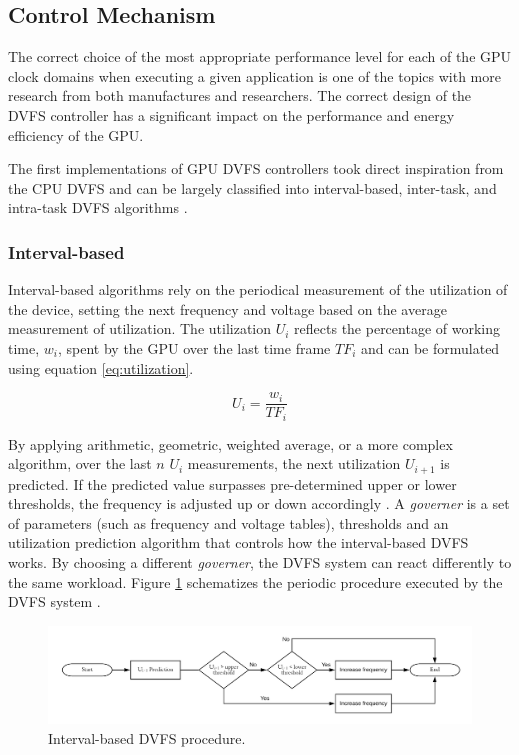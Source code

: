 \subsection{Control Mechanism}

The correct choice of the most appropriate performance level for each of the GPU clock domains when executing a given application is one of the topics with more research from both manufactures and researchers. The correct design of the DVFS controller has a significant impact on the performance and energy efficiency of the GPU.

The first implementations of GPU DVFS controllers took direct inspiration from the CPU DVFS and can be largely classified into interval-based, inter-task, and intra-task DVFS algorithms \cite{boyer_improving_2013}. 

\subsubsection{Interval-based}

Interval-based algorithms rely on the periodical measurement of the utilization of the device, setting the next frequency and voltage based on the average measurement of utilization. The utilization $U_{i}$ reflects the percentage of working time, $w_{i}$, spent by the GPU over the last time frame  $TF_{i}$ and can be formulated using equation \ref{eq:utilization}.

\begin{equation}
    U_i=\frac{w_i}{TF_i}
    \label{eq:utilization}
\end{equation}

By applying arithmetic, geometric, weighted average, or a more complex algorithm, over the last $n$ $U_{i}$ measurements,  the next utilization $U_{i+1}$ is predicted. If the predicted value surpasses pre-determined upper or lower thresholds, the frequency is adjusted up or down accordingly \cite{seongki_gpgpu-perf:_2015}. 
A \textit{governer} is a set of parameters (such as frequency and voltage tables), thresholds and an utilization prediction algorithm that controls how the interval-based DVFS works. By choosing a different \textit{governer}, the DVFS system can react differently to the same workload. Figure \ref{fig:DVFSprocedure} schematizes the periodic procedure executed by the DVFS system \cite{seongki_gpgpu-perf:_2015}. 

\begin{figure}[!htb]
  \centering
  \includegraphics[width=1\textwidth]{Figures/StateArt/DVFSprogram.png}
  \caption[Controller]{Interval-based DVFS procedure.}
  \label{fig:DVFSprocedure}
\end{figure}

